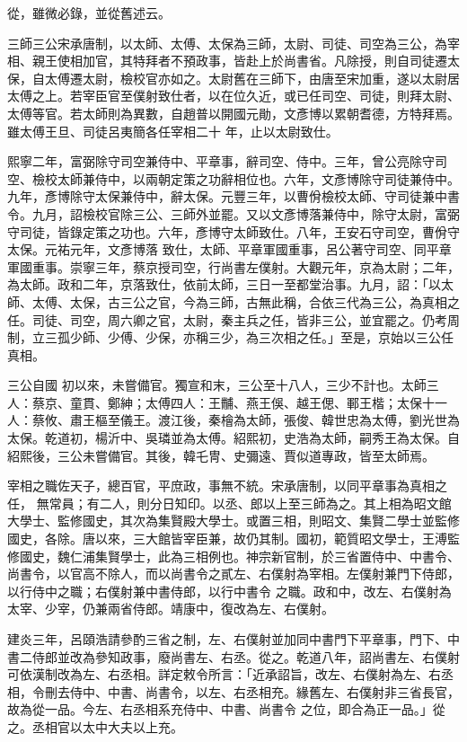\begin{pinyinscope}
 從，雖微必錄，並從舊述云。



 三師三公宋承唐制，以太師、太傅、太保為三師，太尉、司徒、司空為三公，為宰相、親王使相加官，其特拜者不預政事，皆赴上於尚書省。凡除授，則自司徒遷太保，自太傅遷太尉，檢校官亦如之。太尉舊在三師下，由唐至宋加重，遂以太尉居太傅之上。若宰臣官至僕射致仕者，以在位久近，或已任司空、司徒，則拜太尉、太傅等官。若太師則為異數，自趙普以開國元勛，文彥博以累朝耆德，方特拜焉。雖太傅王旦、司徒呂夷簡各任宰相二十
 年，止以太尉致仕。



 熙寧二年，富弼除守司空兼侍中、平章事，辭司空、侍中。三年，曾公亮除守司空、檢校太師兼侍中，以兩朝定策之功辭相位也。六年，文彥博除守司徒兼侍中。九年，彥博除守太保兼侍中，辭太保。元豐三年，以曹佾檢校太師、守司徒兼中書令。九月，詔檢校官除三公、三師外並罷。又以文彥博落兼侍中，除守太尉，富弼守司徒，皆錄定策之功也。六年，彥博守太師致仕。八年，王安石守司空，曹佾守太保。元祐元年，文彥博落
 致仕，太師、平章軍國重事，呂公著守司空、同平章軍國重事。崇寧三年，蔡京授司空，行尚書左僕射。大觀元年，京為太尉；二年，為太師。政和二年，京落致仕，依前太師，三日一至都堂治事。九月，詔：「以太師、太傅、太保，古三公之官，今為三師，古無此稱，合依三代為三公，為真相之任。司徒、司空，周六卿之官，太尉，秦主兵之任，皆非三公，並宜罷之。仍考周制，立三孤少師、少傅、少保，亦稱三少，為三次相之任。」至是，京始以三公任真相。



 三公自國
 初以來，未嘗備官。獨宣和末，三公至十八人，三少不計也。太師三人：蔡京、童貫、鄭紳；太傅四人：王黼、燕王俁、越王偲、鄆王楷；太保十一人：蔡攸、肅王樞至儀王。渡江後，秦檜為太師，張俊、韓世忠為太傅，劉光世為太保。乾道初，楊沂中、吳璘並為太傅。紹熙初，史浩為太師，嗣秀王為太保。自紹熙後，三公未嘗備官。其後，韓乇冑、史彌遠、賈似道專政，皆至太師焉。



 宰相之職佐天子，總百官，平庶政，事無不統。宋承唐制，以同平章事為真相之任，
 無常員；有二人，則分日知印。以丞、郎以上至三師為之。其上相為昭文館大學士、監修國史，其次為集賢殿大學士。或置三相，則昭文、集賢二學士並監修國史，各除。唐以來，三大館皆宰臣兼，故仍其制。國初，範質昭文學士，王溥監修國史，魏仁浦集賢學士，此為三相例也。神宗新官制，於三省置侍中、中書令、尚書令，以官高不除人，而以尚書令之貳左、右僕射為宰相。左僕射兼門下侍郎，以行侍中之職；右僕射兼中書侍郎，以行中書令
 之職。政和中，改左、右僕射為太宰、少宰，仍兼兩省侍郎。靖康中，復改為左、右僕射。



 建炎三年，呂頤浩請參酌三省之制，左、右僕射並加同中書門下平章事，門下、中書二侍郎並改為參知政事，廢尚書左、右丞。從之。乾道八年，詔尚書左、右僕射可依漢制改為左、右丞相。詳定敕令所言：「近承詔旨，改左、右僕射為左、右丞相，令刪去侍中、中書、尚書令，以左、右丞相充。緣舊左、右僕射非三省長官，故為從一品。今左、右丞相系充侍中、中書、尚書令
 之位，即合為正一品。」從之。丞相官以太中大夫以上充。




\end{pinyinscope}
